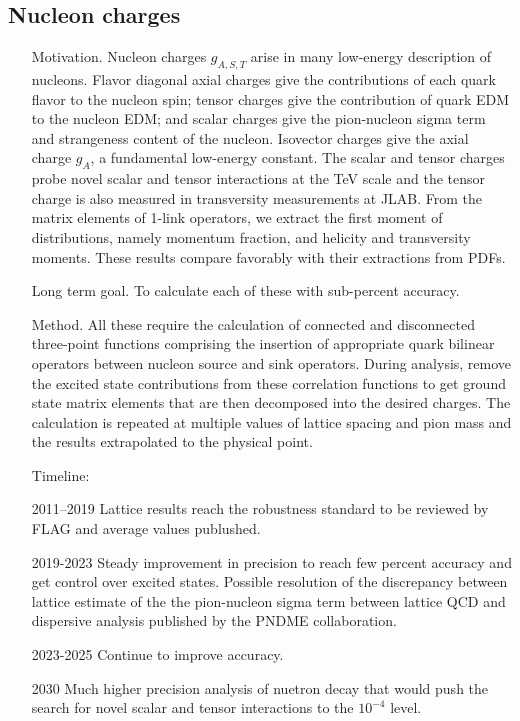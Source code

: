 \documentclass[prd,showpacs,showkeys,preprintnumbers,floatfix,
nofootinbib%
]{revtex4-2}
\begin{document}
\subsection{Nucleon charges}\label{sec:nuccharges}
\begin{itemize}
    \item[Motivation.] Nucleon charges $g_{A,S,T}$ arise in many
      low-energy description of nucleons. Flavor diagonal axial
      charges give the contributions of each quark flavor to the
      nucleon spin; tensor charges give the contribution of quark EDM
      to the nucleon EDM; and scalar charges give the pion-nucleon sigma term and strangeness content of the nucleon. 
      Isovector charges give the axial charge $g_A$, a fundamental low-energy constant. The scalar and tensor 
      charges probe novel scalar and tensor interactions at the TeV scale and the tensor charge is also 
      measured in transversity measurements at JLAB. From the matrix elements of 1-link operators, we extract 
      the first moment of distributions, namely momentum fraction, and helicity and transversity moments. These 
      results compare favorably with their extractions from PDFs.
    \item[Long term goal.] To calculate each of these with sub-percent accuracy. 
    \item[Method.] All these require the calculation of connected and disconnected three-point
      functions comprising the insertion of appropriate quark bilinear operators between 
      nucleon source and sink operators. During analysis, remove the
      excited state contributions from these correlation functions to
      get ground state matrix elements that are then decomposed into
      the desired charges. The calculation is repeated at
      multiple values of lattice spacing and pion mass and the results
      extrapolated to the physical point.
\item[Timeline:]
    \item[2011--2019] Lattice results reach the robustness standard to be reviewed by FLAG and average values publushed.
    \item[2019-2023] Steady improvement in precision to reach few  percent accuracy and get control over excited states. 
      Possible resolution of the discrepancy between lattice estimate of the the pion-nucleon sigma term between lattice QCD and 
      dispersive analysis published by the PNDME collaboration. 
    \item[2023-2025] Continue to improve accuracy. 
    \item[2030] Much higher precision analysis of nuetron decay that
      would push the search for novel scalar and tensor interactions to the $10^{-4}$ level. 
\end{itemize}
\end{document}
